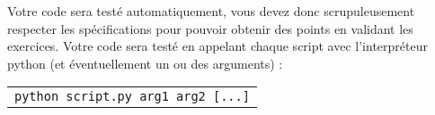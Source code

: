 


\noindent Votre code sera testé automatiquement, vous devez donc scrupuleusement respecter les spécifications pour pouvoir obtenir des points en validant les exercices.
Votre code sera testé en appelant chaque script avec l'interpréteur python (et éventuellement un ou des arguments) :

\medskip

\begin{tabular}{l}
\texttt{python script.py arg1 arg2 [...]}\\
\end{tabular}

\bigskip



